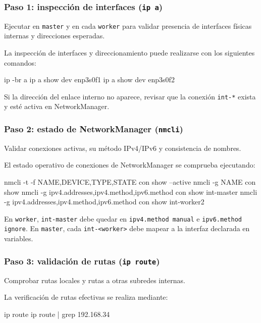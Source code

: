 \subsubsection{Paso 1: inspección de interfaces (\texttt{ip a})}
Ejecutar en \texttt{master} y en cada \texttt{worker} para validar presencia de interfaces físicas internas y direcciones esperadas.

La inspección de interfaces y direccionamiento puede realizarse con los siguientes comandos:

\begin{terminalblock}
ip -br a
ip a show dev enp3s0f1
ip a show dev enp3s0f2
\end{terminalblock}

Si la dirección del enlace interno no aparece, revisar que la conexión \texttt{int-*} exista y esté activa en NetworkManager.

\subsubsection{Paso 2: estado de NetworkManager (\texttt{nmcli})}
Validar conexiones activas, su método IPv4/IPv6 y consistencia de nombres.

El estado operativo de conexiones de NetworkManager se comprueba ejecutando:

\begin{terminalblock}
nmcli -t -f NAME,DEVICE,TYPE,STATE con show --active
nmcli -g NAME con show
nmcli -g ipv4.addresses,ipv4.method,ipv6.method con show int-master
nmcli -g ipv4.addresses,ipv4.method,ipv6.method con show int-worker2
\end{terminalblock}

En \texttt{worker}, \texttt{int-master} debe quedar en \texttt{ipv4.method manual} e \texttt{ipv6.method ignore}. En \texttt{master}, cada \texttt{int-<worker>} debe mapear a la interfaz declarada en variables.

\subsubsection{Paso 3: validación de rutas (\texttt{ip route})}
Comprobar rutas locales y rutas a otras subredes internas.

La verificación de rutas efectivas se realiza mediante:

\begin{terminalblock}
ip route
ip route | grep 192.168.34
\end{terminalblock}

